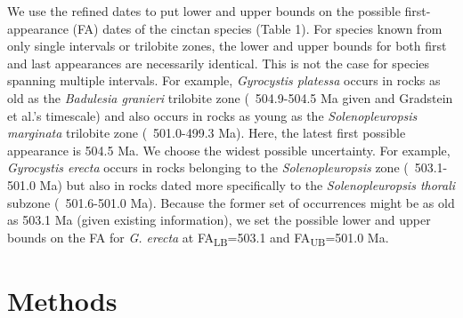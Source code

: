\documentclass{article}
\begin{document}
We use the refined dates to put lower and upper bounds on the possible first-appearance (FA) dates of the cinctan species (Table 1). For species known from only single intervals or trilobite zones, the lower and upper bounds for both first and last appearances are necessarily identical. This is not the case for species spanning multiple intervals. For example, \textit{Gyrocystis platessa} occurs in rocks as old as the \textit{Badulesia granieri} trilobite zone (~504.9-504.5 Ma given \cite{Geyer2019} and Gradstein et al.’s timescale) and also occurs in rocks as young as the \textit{Solenopleuropsis marginata} trilobite zone (~501.0-499.3 Ma).  Here, the latest first possible appearance is 504.5 Ma. We choose the widest possible uncertainty. For example, \textit{Gyrocystis erecta} occurs in rocks belonging to the \textit{Solenopleuropsis} zone (~503.1-501.0 Ma) but also in rocks dated more specifically to the \textit{Solenopleuropsis thorali} subzone (~501.6-501.0 Ma). Because the former set of occurrences might be as old as 503.1 Ma (given existing information), we set the possible lower and upper bounds on the FA for \textit{G. erecta} at FA\textsubscript{LB}=503.1 and FA\textsubscript{UB}=501.0 Ma.

\section{Methods}
\end{document}
